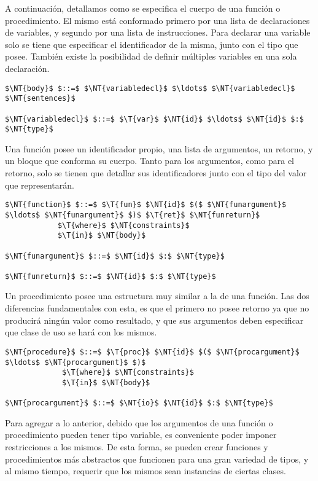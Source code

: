 A continuación, detallamos como se especifica el cuerpo de una función o procedimiento.
El mismo está conformado primero por una lista de declaraciones de variables, y segundo por una lista de instrucciones.
Para declarar una variable solo se tiene que especificar el identificador de la misma, junto con el tipo que posee.
También existe la posibilidad de definir múltiples variables en una sola declaración.

\begin{lstlisting}[style = syntax]
$\NT{body}$ $::=$ $\NT{variabledecl}$ $\ldots$ $\NT{variabledecl}$ $\NT{sentences}$

$\NT{variabledecl}$ $::=$ $\T{var}$ $\NT{id}$ $\ldots$ $\NT{id}$ $:$ $\NT{type}$
\end{lstlisting}

Una función posee un identificador propio, una lista de argumentos, un retorno, y un bloque que conforma su cuerpo.
Tanto para los argumentos, como para el retorno, solo se tienen que detallar sus identificadores junto con el tipo del valor que representarán.

\begin{lstlisting}[style = syntax]
$\NT{function}$ $::=$ $\T{fun}$ $\NT{id}$ $($ $\NT{funargument}$ $\ldots$ $\NT{funargument}$ $)$ $\T{ret}$ $\NT{funreturn}$
            $\T{where}$ $\NT{constraints}$
            $\T{in}$ $\NT{body}$

$\NT{funargument}$ $::=$ $\NT{id}$ $:$ $\NT{type}$

$\NT{funreturn}$ $::=$ $\NT{id}$ $:$ $\NT{type}$
\end{lstlisting}

Un procedimiento posee una estructura muy similar a la de una función.
Las dos diferencias fundamentales con esta, es que el primero no posee retorno ya que no producirá ningún valor como resultado, y que sus argumentos deben especificar que clase de uso se hará con los mismos.

\begin{lstlisting}[style = syntax]
$\NT{procedure}$ $::=$ $\T{proc}$ $\NT{id}$ $($ $\NT{procargument}$ $\ldots$ $\NT{procargument}$ $)$
             $\T{where}$ $\NT{constraints}$
             $\T{in}$ $\NT{body}$

$\NT{procargument}$ $::=$ $\NT{io}$ $\NT{id}$ $:$ $\NT{type}$
\end{lstlisting}

Para agregar a lo anterior, debido que los argumentos de una función o procedimiento pueden tener tipo variable, es conveniente poder imponer restricciones a los mismos.
De esta forma, se pueden crear funciones y procedimientos más abstractos que funcionen para una gran variedad de tipos, y al mismo tiempo, requerir que los mismos sean instancias de ciertas clases.

